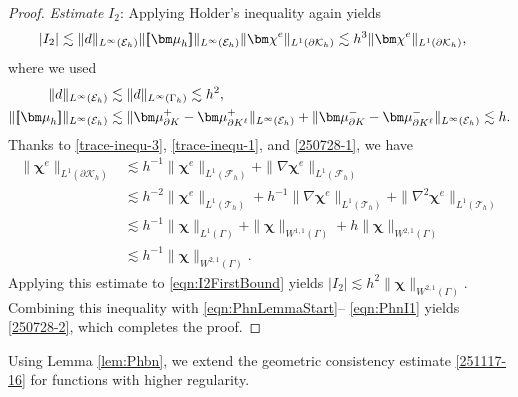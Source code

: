 \documentclass[10pt, a4paper]{amsart}
\def\jump#1{[\hspace{-2pt}[#1]\hspace{-2pt}]}
\newcommand{\p}{\partial}
\newcommand{\nab}{\nabla}
\newcommand{\bmu}{{\bm \mu}}
\newcommand{\calT}{\mathcal{T}}
\newcommand{\calE}{\mathcal{E}}
\newcommand{\calF}{\mathcal{F}}
\newcommand{\calK}{\mathcal{K}}
\newcommand{\bchi}{{\bm \chi}}
\def\jump#1{[\hspace{-2pt}[#1]\hspace{-2pt}]}
\theoremstyle{definition}
\theoremstyle{remark}
\theoremstyle{example}
\numberwithin{equation}{section}
\begin{document}
\begin{proof}
\textit{Estimate} $I_2$: Applying Holder's inequality again yields
\begin{align}\label{eqn:I2FirstBound}
|I_2|
& \lesssim \|d\|_{L^\infty(\calE_h)}\|\jump{\bmu_h}\|_{L^\infty(\calE_h)}\|\bchi^e\|_{L^1(\p\calK_h)}\lesssim h^3 \|\bchi^e\|_{L^1(\p \calK_h)},
\end{align}
where we used
\begin{align*}
\|d\|_{L^\infty(\calE_h)}
& \lesssim \|d\|_{L^\infty(\Gamma_h)} \lesssim h^2, \\
\|\jump{\bmu_h}\|_{L^\infty(\calE_h)}
& \lesssim \|\bmu_{\p K}^+ - \bmu_{\p K^\ell}^+\|_{L^\infty(\calE_h)} + \|\bmu_{\p K}^- - \bmu_{\p K^\ell}^-\|_{L^\infty(\calE_h)} \lesssim h.
\end{align*}
Thanks to \eqref{trace-inequ-3}, \eqref{trace-inequ-1}, and \eqref{250728-1}, we have
\begin{align*}
\|\bchi^e\|_{L^1(\p\calK_h)}
& \lesssim h^{-1}\|\bchi^e\|_{L^1(\calF_h)} + \|\nab\bchi^e\|_{L^1(\calF_h)} \\
& \lesssim h^{-2}\|\bchi^e\|_{L^1(\calT_h)} + h^{-1}\|\nab\bchi^e\|_{L^1(\calT_h)} + \|\nab^2\bchi^e\|_{L^1(\calT_h)} \\
& \lesssim h^{-1}\|\bchi\|_{L^1(\Gamma)} + \|\bchi\|_{W^{1, 1}(\Gamma)} + h\|\bchi\|_{W^{2, 1}(\Gamma)} \\
& \lesssim h^{-1}\|\bchi\|_{W^{2, 1}(\Gamma)}.
\end{align*}
Applying this estimate to \eqref{eqn:I2FirstBound}
yields  $|I_2| \lesssim h^2\|\bchi\|_{W^{2, 1}(\Gamma)}$.
Combining this inequality with \eqref{eqn:PhnLemmaStart}-- \eqref{eqn:PhnI1}
yields \eqref{250728-2}, which completes the proof.
\end{proof}





Using Lemma \ref{lem:Phbn},
we extend the geometric
consistency estimate \eqref{251117-16}
for functions with higher regularity.
\end{document}
